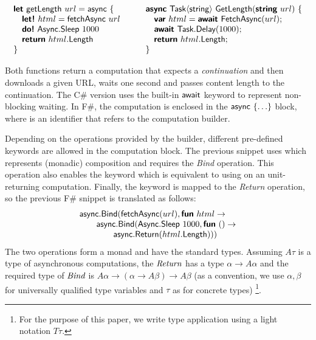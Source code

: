 \documentclass[runningheads,a4paper]{llncs}
\begin{document}
\begin{equation*}
\begin{array}{l}
\kvd{let}~\ident{getLength}~url=\ident{async}~\{\\
\quad \kvd{let!}~html = \ident{fetchAsync}~url\\
\quad \kvd{do!}~\ident{Async}.\ident{Sleep}~1000\\
\quad \kvd{return}~html.\ident{Length}\\
\}
\end{array}\qquad
\begin{array}{l}
\kvd{async}~\ident{Task}\langle\ident{string}\rangle~\ident{GetLength}(\kvd{string}~url)~\{\\
\quad \kvd{var}~html = \kvd{await}~\ident{FetchAsync}(url);\\
\quad \kvd{await}~\ident{Task}.\ident{Delay}(1000);\\
\quad \kvd{return}~html.\ident{Length};\\
\}
\end{array}
\end{equation*}

Both functions return a computation that expects a \emph{continuation} and then downloads a given 
URL, waits one second and passes content length to the continuation. The C\# version uses the built-in
$\textnormal{\sffamily await}$ keyword to represent non-blocking waiting. In F\#, the computation is enclosed
in the $\textnormal{\sffamily async}~\{ \ldots \}$ block, where  is an identifier that refers to
the computation builder. 

Depending on the operations provided by the builder, different pre-defined keywords are allowed
in the computation block. The previous snippet uses  which represents (monadic) 
composition and requires the \emph{Bind} operation. This operation also enables the  
keyword which is equivalent to using  on an unit-returning computation. Finally, the 
 keyword is mapped to the \emph{Return} operation, so the previous F\# snippet is 
translated as follows:
%
\begin{equation*}
\begin{array}{l}
\textnormal{\sffamily async}.\textnormal{\sffamily Bind}(\textnormal{\sffamily fetchAsync}(url), \textnormal{\bfseries\sffamily fun}~html\rightarrow\\
\qquad \textnormal{\sffamily async}.\textnormal{\sffamily Bind}(\textnormal{\sffamily Async}.\textnormal{\sffamily Sleep}~1000, \textnormal{\bfseries\sffamily fun}~()\rightarrow\\
\qquad\qquad \textnormal{\sffamily async}.\textnormal{\sffamily Return}(html.\textnormal{\sffamily Length})))
\end{array}
\end{equation*}
%
The two operations form a monad and have the standard types. Assuming $A\tau$ is a type of asynchronous 
computations, the $\emph{Return}$ has a type $\alpha \rightarrow A\alpha$ and the required type of
$\emph{Bind}$ is $A\alpha \rightarrow (\alpha \rightarrow A\beta) \rightarrow A\beta$ (as a convention,
we use $\alpha, \beta$ for universally qualified type variables and $\tau$ as for concrete types)
\footnote{For the purpose of this paper, we write type application using a light notation $T\tau$. }.
\end{document}
